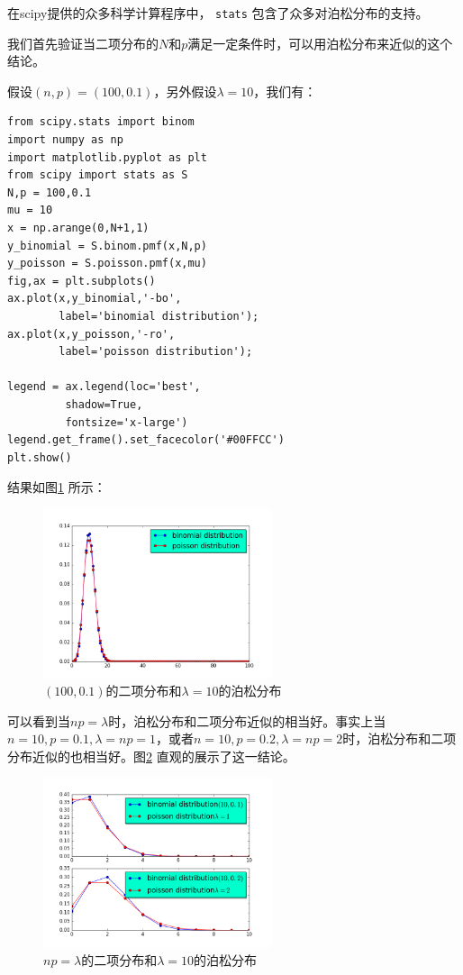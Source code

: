 \documentclass[10pt,a4paper,UTF8]{article}
\begin{document}
在scipy提供的众多科学计算程序中， \texttt{stats} 包含了众多对泊松分布的支持。

我们首先验证当二项分布的\(N\)和\(p\)满足一定条件时，可以用泊松分布来近似的这个结论。

假设\((n,p) = (100,0.1)\)，另外假设\(\lambda = 10\)，我们有：

\lstset{language=Python,label= ,caption= ,captionpos=b,firstnumber=1,numbers=left}
\begin{lstlisting}
from scipy.stats import binom
import numpy as np
import matplotlib.pyplot as plt
from scipy import stats as S
N,p = 100,0.1
mu = 10
x = np.arange(0,N+1,1)
y_binomial = S.binom.pmf(x,N,p)
y_poisson = S.poisson.pmf(x,mu)
fig,ax = plt.subplots()
ax.plot(x,y_binomial,'-bo',
        label='binomial distribution');
ax.plot(x,y_poisson,'-ro',
        label='poisson distribution');

legend = ax.legend(loc='best',
         shadow=True,
         fontsize='x-large')
legend.get_frame().set_facecolor('#00FFCC')
plt.show()

\end{lstlisting}

结果如图\ref{fig:org6bdfa2e} 所示：
\begin{figure}[htbp]
\centering
\includegraphics[width=0.6\textwidth]{../../img/math_probability/20170701binomialvspoisson1.png}
\caption{\label{fig:org6bdfa2e}
\((100,0.1)\)的二项分布和\(\lambda = 10\)的泊松分布}
\end{figure}


可以看到当\(np = \lambda\)时，泊松分布和二项分布近似的相当好。事实上当\(n=10,p=0.1,\lambda = np = 1\)，或者\(n = 10, p = 0.2,\lambda = np =2\)时，泊松分布和二项分布近似的也相当好。图\ref{fig:org1dbf04c} 直观的展示了这一结论。
\begin{figure}[htbp]
\centering
\includegraphics[width=0.6\textwidth]{../../img/math_probability/20170701binomialvspoisson2.png}
\caption{\label{fig:org1dbf04c}
\(np=\lambda\)的二项分布和\(\lambda = 10\)的泊松分布}
\end{figure}
\end{document}
